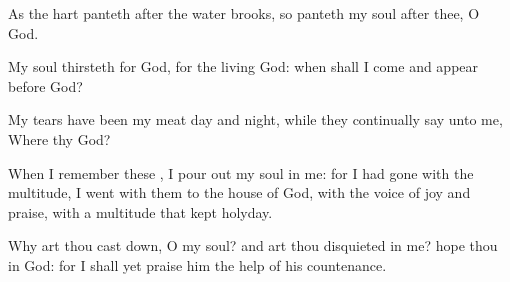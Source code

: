{\Q {}As the
hart
panteth after the
water
brooks, so
panteth my
soul after thee, O
God.


\par }{\Q {}My
soul
thirsteth for
God, for the
living
God: when shall I
come and
appear
before
God?


\par }{\Q {}My
tears have been my
meat
day and
night, while they
continually
say unto me, Where
{} thy
God?


\par }{\Q {}When I
remember these
{}, I pour
out my
soul in me: for I had
gone with the
multitude, I
went with them to the
house of
God, with the
voice of
joy and
praise, with a
multitude that kept
holyday.


\par }{\Q {}Why art thou cast
down, O my
soul? and
{} art thou
disquieted in me?
hope thou in
God: for I shall yet
praise him
{} the
help of his
countenance.


\par }{\BB \par }
